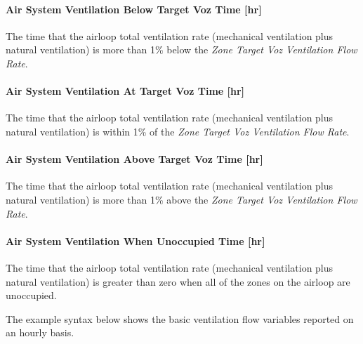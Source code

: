 \paragraph{Air System Ventilation Below Target Voz Time {[}hr{]}}\label{air-system-ventilation-below-target-voz-time}
The time that the airloop total ventilation rate (mechanical ventilation plus natural ventilation) is more than 1\% below the \emph{Zone Target Voz Ventilation Flow Rate}.

\paragraph{Air System Ventilation At Target Voz Time {[}hr{]}}\label{air-system-ventilation-at-target-voz-time}
The time that the airloop total ventilation rate (mechanical ventilation plus natural ventilation) is within 1\% of the \emph{Zone Target Voz Ventilation Flow Rate}.

\paragraph{Air System Ventilation Above Target Voz Time {[}hr{]}}\label{air-system-ventilation-above-target-voz-time}
The time that the airloop total ventilation rate (mechanical ventilation plus natural ventilation) is more than 1\% above the \emph{Zone Target Voz Ventilation Flow Rate}.

\paragraph{Air System Ventilation When Unoccupied Time {[}hr{]}}\label{air-system-ventilation-when-unoccupied-time}
The time that the airloop total ventilation rate (mechanical ventilation plus natural ventilation) is greater than zero when all of the zones on the airloop are unoccupied.



The example syntax below shows the basic ventilation flow variables reported on an hourly basis.

